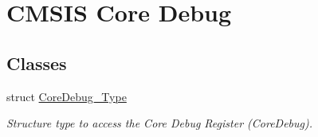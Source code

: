 \hypertarget{group___c_m_s_i_s___core_debug}{\section{C\-M\-S\-I\-S Core Debug}
\label{group___c_m_s_i_s___core_debug}
}
\subsection*{Classes}
\begin{DoxyCompactItemize}
\item 
struct \hyperlink{struct_core_debug___type}{Core\-Debug\-\_\-\-Type}
\begin{DoxyCompactList}\small\item\em Structure type to access the Core Debug Register (Core\-Debug). \end{DoxyCompactList}\end{DoxyCompactItemize}
